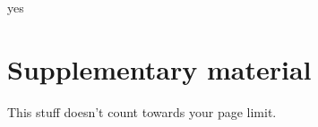\documentclass{article}
\begin{document}
yes 


\printbibliography



\appendix

\section{Supplementary material} \label{app:info}

This stuff doesn't count towards your page limit.
\end{document}
